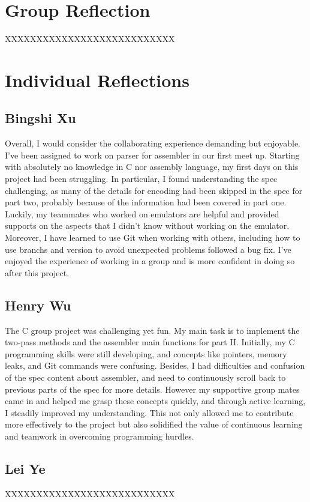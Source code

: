 \documentclass[11pt]{article}
\begin{document}
\section{Group Reflection}
XXXXXXXXXXXXXXXXXXXXXXXXXXX

\section{Individual Reflections}

\subsection{Bingshi Xu}
Overall, I would consider the collaborating experience demanding but enjoyable. I've been assigned to work on parser for assembler in our first meet up.
Starting with absolutely no knowledge in C nor assembly language, my first days on this project had been struggling. 
In particular, I found understanding the spec challenging, as many of the details for encoding had been skipped in the spec for part two, probably because of 
the information had been covered in part one. 
Luckily, my teammates who worked on emulators are helpful and provided supports on the aspects that I didn't know without working on the emulator.
Moreover, I have learned to use Git when working with others, including how to use branchs and version to avoid unexpected problems followed a bug fix.
I've enjoyed the experience of working in a group and is more confident in doing so after this project.  

\subsection{Henry Wu}
The C group project was challenging yet fun. My main task is to implement the two-pass methods and the assembler main functions for part II. 
Initially, my C programming skills were still developing, and concepts like pointers, memory leaks, 
and Git commands were confusing. Besides, I had difficulties and confusion of the spec content about assembler, 
and need to continuously scroll back to previous parts of the spec for more details. However my supportive 
group mates came in and helped me grasp these concepts quickly, and through active learning, I steadily improved my understanding. 
This not only allowed me to contribute more effectively to the project but also solidified the value of continuous 
learning and teamwork in overcoming programming hurdles.

\subsection{Lei Ye}
XXXXXXXXXXXXXXXXXXXXXXXXXXX
\end{document}
